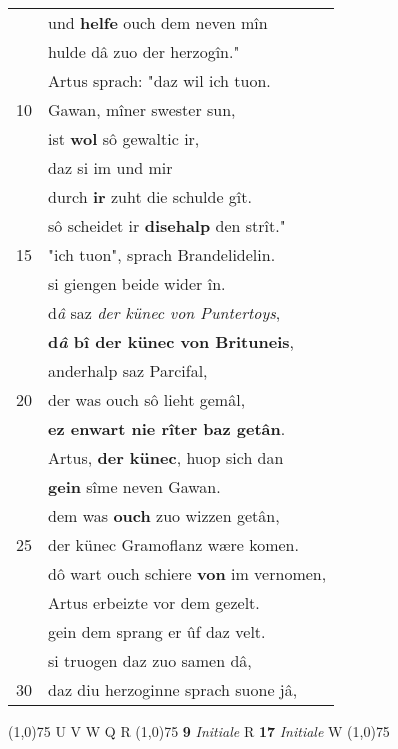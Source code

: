 \documentclass[8pt,a4paper,notitlepage]{article}
\begin{document}
\begin{table}[ht]
\begin{minipage}[t]{0.5\linewidth}
\begin{tabular}{rl}
 & und \textbf{helfe} ouch dem neven mîn\\ 
 & hulde dâ zuo der herzogîn."\\ 
 & Artus sprach: "daz wil ich tuon.\\ 
10 & Gawan, mîner swester sun,\\ 
 & ist \textbf{wol} sô gewaltic ir,\\ 
 & daz si im und mir\\ 
 & durch \textbf{ir} zuht die schulde gît.\\ 
 & sô scheidet ir \textbf{disehalp} den strît."\\ 
15 & "ich tuon", sprach Brandelidelin.\\ 
 & si giengen beide wider în.\\ 
 & d\textit{â} saz \textit{der künec von Puntertoys},\\ 
 & \textbf{d\textit{â} bî der künec von Brituneis},\\ 
 & anderhalp saz Parcifal,\\ 
20 & der was ouch sô lieht gemâl,\\ 
 & \textbf{ez enwart nie rîter baz getân}.\\ 
 & Artus, \textbf{der künec}, huop sich dan\\ 
 & \textbf{gein} sîme neven Gawan.\\ 
 & dem was \textbf{ouch} zuo wizzen getân,\\ 
25 & der künec Gramoflanz wære komen.\\ 
 & dô wart ouch schiere \textbf{von} im vernomen,\\ 
 & Artus erbeizte vor dem gezelt.\\ 
 & gein dem sprang er ûf daz velt.\\ 
 & si truogen daz zuo samen dâ,\\ 
30 & daz diu herzoginne sprach suone jâ,\\ 
\end{tabular}
\scriptsize
\line(1,0){75} \newline
U V W Q R \newline
\line(1,0){75} \newline
\textbf{9} \textit{Initiale} R  \textbf{17} \textit{Initiale} W  \newline
\line(1,0){75} \newline

\end{minipage}
\end{table}
\end{document}
